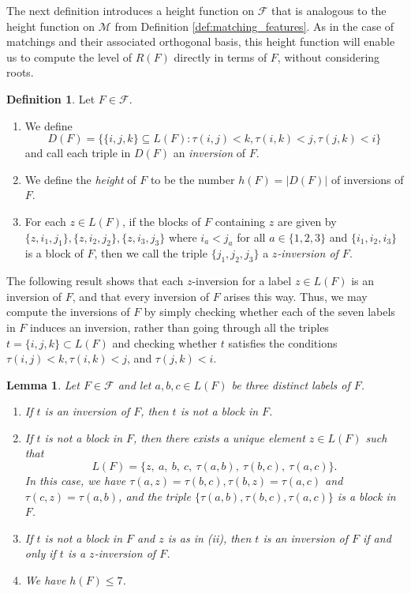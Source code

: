 \documentclass[11pt]{amsart}
\theoremstyle{plain}
\newtheorem{lemma}[theorem]{Lemma}
\theoremstyle{definition}
\newtheorem{defn}[theorem]{Definition}
\theoremstyle{remark}
\numberwithin{equation}{section}
\newcommand{\calf}{\mathcal{F}}
\newcommand{\calm}{\mathcal{M}}
\newcommand{\se}{\subseteq}
\newcommand{\abs}[1]{\lvert #1 \rvert}
\begin{document}
The next definition introduces a height function on $\calf$ that is analogous to
the height function on $\calm$ from Definition \ref{def:matching_features}. As
in the case of matchings and their associated orthogonal basis, this height
function will enable us to compute the level of $R(F)$ directly in terms of $F$,
without considering roots.


\begin{defn}
  \label{def:fob_height}
Let $F\in \calf$.
\begin{enumerate}
  \item We define 
    \[
      D(F)=\{\{i,j,k\}\se L(F): \tau(i,j)<k, \tau(i,k)<j, \tau(j,k)<i\}
    \]
    and call each triple in $D(F)$ an \emph{inversion} of $F$. 

  \item We define the \emph{height} of $F$ to be the number $h(F)=\abs{D(F)}$ of
    inversions of $F$.

\item For each $z\in L(F)$, if the blocks of $F$ containing $z$ are given
  by $\{z,i_1,j_1\}, \{z,i_2,j_2\}, \{z,i_3,j_3\}$ where $i_a<j_a$ for all $a\in
  \{1,2,3\}$ and $\{i_1,i_2,i_3\}$ is a block of $F$, then we call the
  triple $\{j_1,j_2,j_3\}$ a \emph{$z$-inversion of $F$}.
\end{enumerate}
\end{defn} 

The following result shows that each $z$-inversion for a label $z\in L(F)$ is an
inversion of $F$, and that every inversion of $F$ arises this way. Thus, we may compute the inversions of
$F$ by simply checking whether each of the seven labels in $F$ induces an
inversion, rather than going through all the triples $t=\{i,j,k\}\subset L(F)$
and checking whether $t$ satisfies the conditions $\tau(i,j)<k, \tau(i,k)<j$,
and $\tau(j,k)<i$.

\begin{lemma}\label{lem:fano_inv}
Let $F \in \calf$ and let $a,b,c\in L(F)$ be three distinct labels of $F$.
\begin{enumerate}
\item{If $t$ is an inversion of $F$, then $t$ is not a block in $F$.}

\item If $t$ is not a block in $F$, then there exists a unique element
    $z\in L(F)$ such that
    \[
    L(F) = \{z, \ a, \ b, \ c, \ \tau(a, b), \ \tau(b, c), \ \tau(a, c)\}.
  \] 
  In this case, we have $\tau(a,z)=\tau(b,c), \tau(b,z)=\tau(a,c)$ and
  $\tau(c,z)=\tau(a,b)$, and the triple $\{\tau(a,b),\tau(b,c),\tau(a,c)\}$ is a
  block in $F$.

\item If $t$ is not a block in $F$ and $z$ is as in (ii), then $t$ is an
  inversion of $F$ if and only if $t$ is a $z$-inversion of $F$.

\item We have $h(F)\le 7$.
\end{enumerate}
\end{lemma}
\end{document}
